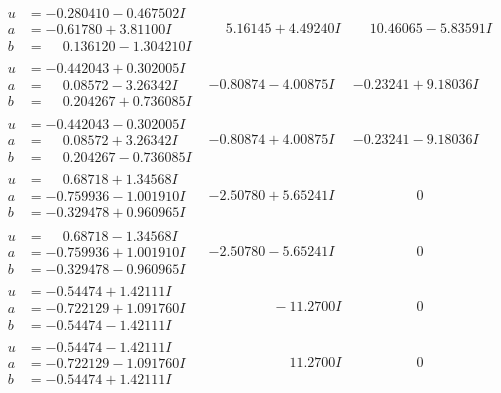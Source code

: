 \documentclass[1p]{elsarticle_modified}
\theoremstyle{definition}
\begin{document}
$$\begin{array}{c|c|c}
\begin{aligned}
u &= -0.280410 - 0.467502 I \\
a &= -0.61780 + 3.81100 I \\
b &= \phantom{-}0.136120 - 1.304210 I\end{aligned}
 & \phantom{-}5.16145 + 4.49240 I & \phantom{-}10.46065 - 5.83591 I \\ \hline\begin{aligned}
u &= -0.442043 + 0.302005 I \\
a &= \phantom{-}0.08572 - 3.26342 I \\
b &= \phantom{-}0.204267 + 0.736085 I\end{aligned}
 & -0.80874 - 4.00875 I & -0.23241 + 9.18036 I \\ \hline\begin{aligned}
u &= -0.442043 - 0.302005 I \\
a &= \phantom{-}0.08572 + 3.26342 I \\
b &= \phantom{-}0.204267 - 0.736085 I\end{aligned}
 & -0.80874 + 4.00875 I & -0.23241 - 9.18036 I \\ \hline\begin{aligned}
u &= \phantom{-}0.68718 + 1.34568 I \\
a &= -0.759936 - 1.001910 I \\
b &= -0.329478 + 0.960965 I\end{aligned}
 & -2.50780 + 5.65241 I & \phantom{-0.000000 } 0 \\ \hline\begin{aligned}
u &= \phantom{-}0.68718 - 1.34568 I \\
a &= -0.759936 + 1.001910 I \\
b &= -0.329478 - 0.960965 I\end{aligned}
 & -2.50780 - 5.65241 I & \phantom{-0.000000 } 0 \\ \hline\begin{aligned}
u &= -0.54474 + 1.42111 I \\
a &= -0.722129 + 1.091760 I \\
b &= -0.54474 - 1.42111 I\end{aligned}
 & \phantom{-0.000000 } -11.2700 I & \phantom{-0.000000 } 0 \\ \hline\begin{aligned}
u &= -0.54474 - 1.42111 I \\
a &= -0.722129 - 1.091760 I \\
b &= -0.54474 + 1.42111 I\end{aligned}
 & \phantom{-0.000000 -}11.2700 I & \phantom{-0.000000 } 0 \\ \hline\begin{aligned}

\end{aligned}
\end{array}$$
\end{document}
